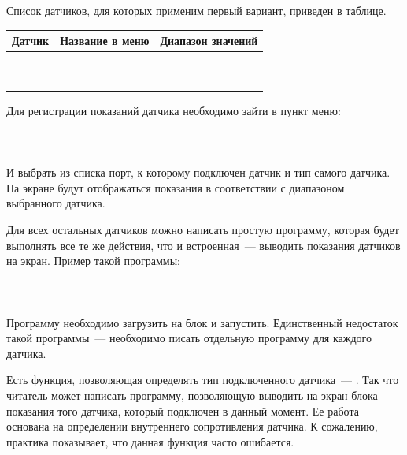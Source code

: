 Список датчиков, для которых применим первый вариант, приведен в таблице. 

\begin{center}
	\begin{tabular}[h!]{|c|c|c|}
		\hline
		{Датчик}&{Название в меню}&{Диапазон значений}\\
		\hline
		~ & ~ & ~\\
		\hline
		~ & ~ & ~\\
		\hline
	\end{tabular}
\end{center}

Для регистрации показаний датчика необходимо зайти в пункт меню:\\\\

\\\\

И выбрать из списка порт, к которому подключен датчик и тип самого датчика. На экране будут отображаться показания в соответствии с диапазоном выбранного датчика.

Для всех остальных датчиков можно написать простую программу, которая будет выполнять все те же действия, что и встроенная~--- выводить показания датчиков на экран. Пример такой программы:\\\\

\\\\

Программу необходимо загрузить на блок и запустить. Единственный недостаток такой программы~--- необходимо писать отдельную программу для каждого датчика.

Есть функция, позволяющая определять тип подключенного датчика~--- . Так что читатель может написать программу, позволяющую выводить на экран блока показания того датчика, который подключен в данный момент. Ее работа основана на определении внутреннего сопротивления датчика. К сожалению, практика показывает, что данная функция часто ошибается.